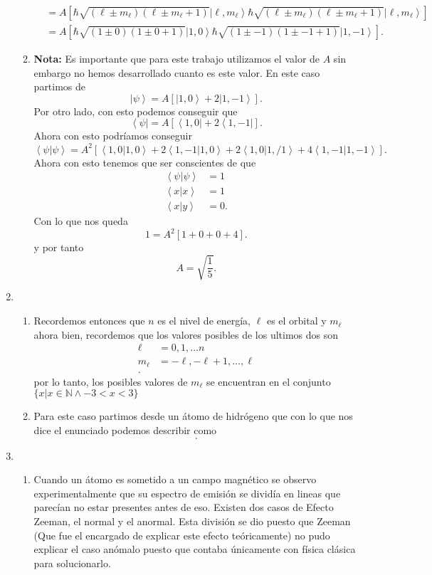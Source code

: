 \documentclass[12pt]{exam}
\begin{document}
\begin{enumerate}
\begin{enumerate}
\begin{align*}
			  &= A\left[ \hbar\sqrt{(\ell\pm m_\ell)(\ell\pm m_\ell + 1)}\left|\ell,m_\ell\right>  \hbar\sqrt{(\ell\pm m_\ell)(\ell\pm m_\ell + 1)}\left|\ell,m_\ell\right> \right]  \\
			  &= A\left[ \hbar\sqrt{(1\pm 0)(1\pm 0 + 1)}\left|1,0\right>  \hbar\sqrt{(1\pm -1)(1\pm -1 + 1)}\left|1,-1\right> \right]
  .\end{align*}
\item \textbf{Nota:} Es importante que para este trabajo utilizamos el valor de $A$ sin embargo no hemos desarrollado cuanto es este valor. En este caso partimos de \[
    \left|\psi\right> = A\left[ \left|1,0\right> + 2\left|1,-1\right> \right] 
.\] Por otro lado, con esto podemos conseguir que \[
\left<\psi\right|= A\left[ \left<1,0\right|+2\left< 1, -1\right| \right] 
.\] Ahora con esto podríamos conseguir \[
\left< \psi | \psi \right> = A^2 \left[ \left< 1,0 | 1,0 \right> + 2\left< 1, -1 | 1, 0 \right> + 2 \left< 1,0 | 1,/1 \right>  + 4\left< 1, -1 | 1, -1 \right>  \right] 
.\] Ahora con esto tenemos que ser conscientes de que
\begin{align*}
  \left< \psi | \psi \right> &= 1 \\
  \left< x | x \right> &= 1 \\
  \left< x | y \right> &=  0 
.\end{align*}
Con lo que nos queda \[
  1 = A^2\left[ 1 + 0 + 0 + 4 \right] 
.\] y por tanto \[
A = \sqrt{\frac{1}{5}}
.\] 
    \end{enumerate}
  \item 
    \begin{enumerate}
      \item Recordemos entonces que $n$ es el nivel de energía, $\ell$ es el orbital y $m_\ell$ ahora bien, recordemos que los valores posibles de los ultimos dos son
	\begin{align*}
	  \ell &= 0, 1, \ldots n \\
	  m_\ell &= -\ell,-\ell+1,\ldots,\ell \\
	.\end{align*}
	por lo tanto, los posibles valores de $m_\ell$ se encuentran en el conjunto  $\{x | x\in\mathbb{N}\land -3<x<3\}$ 
      \item Para este caso partimos desde un átomo de hidrógeno que con lo que nos dice el enunciado podemos describir como \[    
      .\] 
    \end{enumerate}
  \item 
    \begin{enumerate}
      \item Cuando un átomo es sometido a un campo magnético se observo experimentalmente que su espectro de emisión se dividía en lineas que parecían no estar presentes antes de eso. Existen dos casos de Efecto Zeeman, el normal y el anormal. Esta división se dio puesto que Zeeman (Que fue el encargado de explicar este efecto teóricamente) no pudo explicar el caso anómalo puesto que contaba únicamente con física clásica para solucionarlo. 

\end{enumerate}
\end{enumerate}
\end{document}
